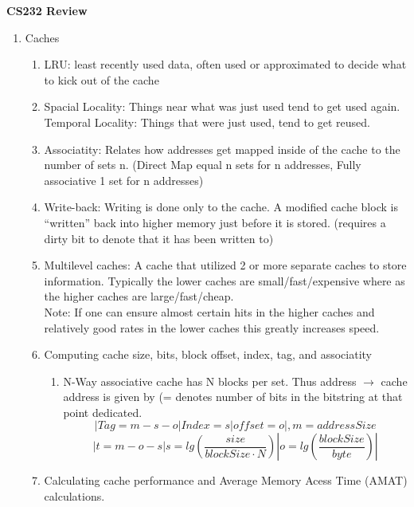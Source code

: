 \documentclass[12pt]{article}
\renewcommand{\=}[1]{\stackrel{#1}{=}} %
\theoremstyle{definition}
\theoremstyle{remark}
\begin{document}
\begin{center}
  {\LARGE
    \textbf{CS232 Review}\\
  }
  \begin{enumerate}
  \item Caches
    \begin{enumerate}
    \item LRU: least recently used data, often used or approximated to
      decide what to kick out of the cache
    \item
      Spacial Locality: Things near what was just used tend to get used
      again.\\
      Temporal Locality: Things that were just used, tend to get reused.
    \item Associatity: Relates how addresses get mapped inside of
      the cache to the number of sets n. (Direct Map equal n sets for
      n addresses, Fully associative 1 set for n addresses)
    \item Write-back: Writing is done only to the cache. A modified
      cache block is ``written'' back into higher memory just before
      it is stored. (requires a dirty bit to denote that it has been
      written to)
    \item Multilevel caches: A cache that utilized 2 or more separate
      caches to store information. Typically the lower caches are
      small/fast/expensive where as the higher caches are
      large/fast/cheap.\\
      Note: If one can ensure almost certain hits in the higher caches
      and relatively good rates in the lower caches this greatly
      increases speed.
    \item Computing cache size, bits, block offset, index, tag, and associatity
      \begin{enumerate}
      \item N-Way associative cache has N blocks per set. Thus
        address $\rightarrow$ cache address is given by (= denotes
        number of bits in the bitstring at that point dedicated.
        \begin{equation}
          |Tag=m-s-o|Index=s|offset=o|, m = addressSize
        \end{equation}
        \begin{equation}
          |t = m-o-s | s = lg(\frac{size}{blockSize\cdot N})|o = lg(\frac{blockSize}{byte})|
        \end{equation}
      \end{enumerate}
    \item Calculating cache performance and Average Memory Acess Time (AMAT) calculations.

\end{enumerate}
\end{enumerate}
\end{center}
\end{document}
